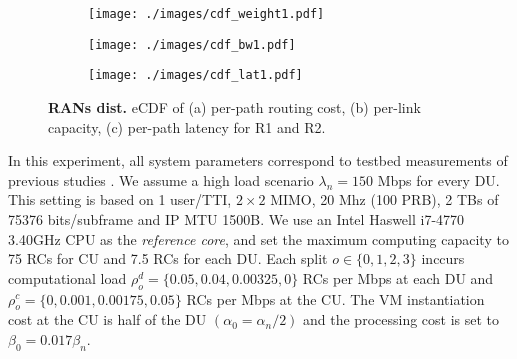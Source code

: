 
\begin{figure}[t]
	\centering
	\begin{subfigure}[t]{.23\textwidth}
		\centering
		\texttt{[image: ./images/cdf\_weight1.pdf]}
		\small\caption{\small}
	\end{subfigure}
	\begin{subfigure}[t]{.235\textwidth}
		\centering
		\texttt{[image: ./images/cdf\_bw1.pdf]}
		\small\caption{\small }
	\end{subfigure}
	\begin{subfigure}[t]{.235\textwidth}
		\centering
		\texttt{[image: ./images/cdf\_lat1.pdf]}
		\small\caption{\small }
	\end{subfigure}
	\caption{\small \textbf{RANs dist.} eCDF of (a) per-path routing cost, (b) per-link capacity, (c) per-path latency for R1 and R2.}
	\label{fig:ran}	
	\label{fig:ran_params}
	\vspace{-3mm}	
\end{figure}



In this experiment, all system parameters correspond to testbed measurements of previous studies \cite{crancomplexity, vranmec_andres, vran_murti2,cost_vm}. We assume a high load scenario $\lambda_{n} = 150$ Mbps for every DU. This setting is based on 1 user/TTI, $2 \times 2$ MIMO, 20 Mhz (100 PRB), 2 TBs of 75376 bits/subframe and IP MTU 1500B. We use an Intel Haswell i7-4770 3.40GHz CPU as the \textit{reference core}, and set the maximum computing capacity to 75 RCs for CU and 7.5 RCs for each DU. Each split $o \in \{ 0,1,2,3 \}$ inccurs computational load $\rho_{o}^{{d}} = \{ 0.05, 0.04, 0.00325, 0\}$ RCs per Mbps at each DU and $\rho_{o}^{{c}} = \{0, 0.001, 0.00175, 0.05 \} $ RCs per Mbps at the CU. The VM instantiation cost at the CU is half of the DU $(\alpha_0 = \alpha_n/2)$ and the processing cost is set to $\beta_0 = 0.017 \beta_n$. 

